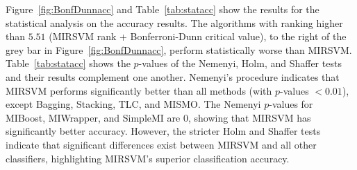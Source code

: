 \documentclass[preprint,12pt]{elsarticle}
\begin{document}
Figure~\ref{fig:BonfDunnacc} and Table~\ref{tab:statacc} show the results for the statistical analysis on the accuracy results. The algorithms with ranking higher than $5.51$ (MIRSVM rank + Bonferroni-Dunn critical value), to the right of the grey bar in Figure~\ref{fig:BonfDunnacc}, perform statistically worse than MIRSVM. Table~\ref{tab:statacc} shows the $p$-values of the Nemenyi, Holm, and Shaffer tests and their results complement one another. Nemenyi's procedure indicates that MIRSVM performs significantly better than all methods (with $p$-values $< 0.01$), except Bagging, Stacking, TLC, and MISMO. The Nemenyi $p$-values for MIBoost, MIWrapper, and SimpleMI are $0$, showing that MIRSVM has significantly better accuracy. However, the stricter Holm and Shaffer tests indicate that significant differences exist between MIRSVM and all other classifiers, highlighting MIRSVM's superior classification accuracy. 
\end{document}
